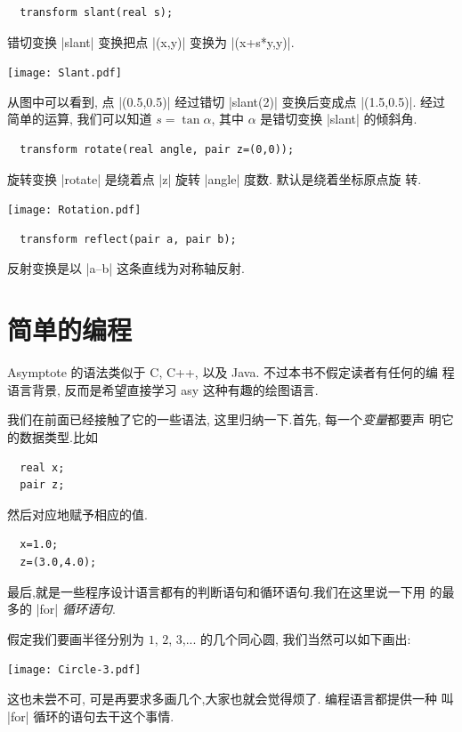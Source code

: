 \documentclass[nofonts,CJKnormalspaces]{ctexbook}
\begin{document}
\begin{lstlisting}
  transform slant(real s);
\end{lstlisting}

错切变换 |slant| 变换把点 |(x,y)| 变换为 |(x+s*y,y)|.
\begin{center}\texttt{[image: Slant.pdf]}\end{center}%

从图中可以看到, 点 |(0.5,0.5)| 经过错切 |slant(2)| 变换后变成点
|(1.5,0.5)|. 经过简单的运算, 我们可以知道 $s=\tan\alpha$, 其中
$\alpha$ 是错切变换 |slant| 的倾斜角.

\begin{lstlisting}
  transform rotate(real angle, pair z=(0,0));
\end{lstlisting}
旋转变换 |rotate| 是绕着点 |z| 旋转 |angle| 度数. 默认是绕着坐标原点旋
转.
\begin{center}\texttt{[image: Rotation.pdf]}\end{center}%


\begin{lstlisting}
  transform reflect(pair a, pair b);
\end{lstlisting}
反射变换是以 |a--b| 这条直线为对称轴反射.


\section{简单的编程}
Asymptote 的语法类似于 C, C++, 以及 Java. 不过本书不假定读者有任何的编
程语言背景, 反而是希望直接学习 asy 这种有趣的绘图语言.

我们在前面已经接触了它的一些语法, 这里归纳一下.首先, 每一个\emph{变量}都要声
明它的数据类型.比如

\begin{lstlisting}
  real x;
  pair z;
\end{lstlisting}
然后对应地赋予相应的值.
\begin{lstlisting}
  x=1.0;
  z=(3.0,4.0);
\end{lstlisting}

最后,就是一些程序设计语言都有的判断语句和循环语句.我们在这里说一下用
的最多的 |for| \emph{循环语句}.

假定我们要画半径分别为 $1$, $2$, $3$,...
的几个同心圆, 我们当然可以如下画出:
\begin{center}\texttt{[image: Circle-3.pdf]}\end{center}%


这也未尝不可, 可是再要求多画几个,大家也就会觉得烦了. 编程语言都提供一种
叫 |for| 循环的语句去干这个事情.
\end{document}
